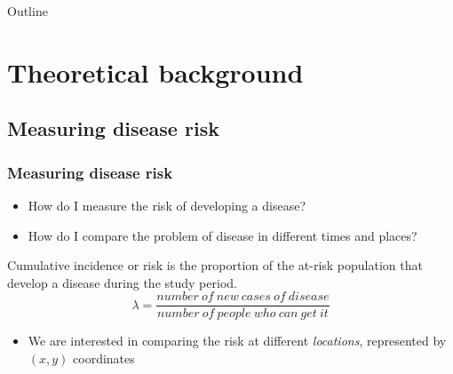 \documentclass{beamer}
\theoremstyle{definition}
\begin{document}
\begin{frame}{Outline}
\tableofcontents[hideallsubsections]
\end{frame}

\section{Theoretical background}

\subsection{Measuring disease risk}
\begin{frame}\frametitle{Measuring disease risk}
    \begin{itemize}
        \item How do I measure the risk of developing a disease?
        \item How do I compare the problem of disease in different times and places?
    \end{itemize}
    \begin{definition}
        \alert{Cumulative incidence} or \alert{risk} is the proportion of the at-risk population that develop a disease during the study period.
        \begin{equation*}
            \lambda = \frac{number~of~new~cases~of~disease}{number~of~people~who~can~get~it}
        \end{equation*}
        \cite{bonita2006basic}
    \end{definition}
    \begin{itemize}
        \item We are interested in comparing the risk at different \emph{locations}, represented by $(x,y)$ coordinates
    \end{itemize}
\end{frame}

\end{document}
